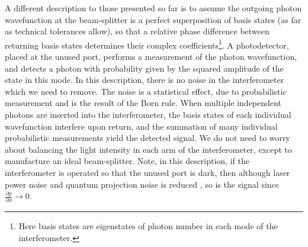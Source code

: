 \documentclass[reqno]{amsart}
\begin{document}
A different description to those presented so far is to assume the outgoing photon wavefunction at the beam-splitter is a perfect superposition of basis states (as far as technical tolerances allow), so that a relative phase difference between returning basis states determines their complex coefficients\footnote{Here basis states are eigenstates of photon number in each mode of the interferometer.}. A photodetector, placed at the unused port, performs a measurement of the photon wavefunction, and detects a photon with probability given by the squared amplitude of the state in this mode. In this description, there is no noise in the interferometer which we need to remove. The noise is a statistical effect, due to probabilistic measurement and is the result of the Born rule. When multiple independent photons are inserted into the interferometer, the basis states of each individual wavefunction interfere upon return, and the summation of many individual probabilistic measurements yield the detected signal. We do not need to worry about balancing the light intensity in each arm of the interferometer, except to manufacture an ideal beam-splitter. Note, in this description, if the interferometer is operated so that the unused port is dark, then although laser power noise and quantum projection noise is reduced \cite{Itano1993}, so is the signal since $\frac{\partial p}{\partial \phi} \rightarrow 0$.%
\end{document}
